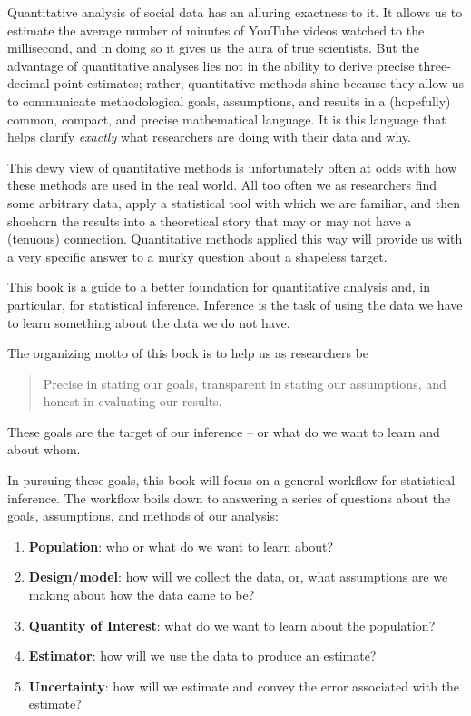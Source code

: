 \documentclass[
  letterpaper,
  DIV=11,
  numbers=noendperiod]{scrreprt}
\providecommand{\tightlist}{%
  \setlength{\itemsep}{0pt}\setlength{\parskip}{0pt}}\usepackage{longtable,booktabs,array}
\theoremstyle{plain}
\theoremstyle{definition}
\theoremstyle{definition}
\theoremstyle{remark}
\begin{document}
Quantitative analysis of social data has an alluring exactness to it. It
allows us to estimate the average number of minutes of YouTube videos
watched to the millisecond, and in doing so it gives us the aura of true
scientists. But the advantage of quantitative analyses lies not in the
ability to derive precise three-decimal point estimates; rather,
quantitative methods shine because they allow us to communicate
methodological goals, assumptions, and results in a (hopefully) common,
compact, and precise mathematical language. It is this language that
helps clarify \emph{exactly} what researchers are doing with their data
and why.

This dewy view of quantitative methods is unfortunately often at odds
with how these methods are used in the real world. All too often we as
researchers find some arbitrary data, apply a statistical tool with
which we are familiar, and then shoehorn the results into a theoretical
story that may or may not have a (tenuous) connection. Quantitative
methods applied this way will provide us with a very specific answer to
a murky question about a shapeless target.

This book is a guide to a better foundation for quantitative analysis
and, in particular, for statistical inference. Inference is the task of
using the data we have to learn something about the data we do not have.

The organizing motto of this book is to help us as researchers be

\begin{quote}
Precise in stating our goals, transparent in stating our assumptions,
and honest in evaluating our results.
\end{quote}

These goals are the target of our inference -- or what do we want to
learn and about whom.

In pursuing these goals, this book will focus on a general workflow for
statistical inference. The workflow boils down to answering a series of
questions about the goals, assumptions, and methods of our analysis:

\begin{enumerate}
\def\labelenumi{\arabic{enumi}.}
\tightlist
\item
  \textbf{Population}: who or what do we want to learn about?
\item
  \textbf{Design/model}: how will we collect the data, or, what
  assumptions are we making about how the data came to be?
\item
  \textbf{Quantity of Interest}: what do we want to learn about the
  population?\\
\item
  \textbf{Estimator}: how will we use the data to produce an estimate?
\item
  \textbf{Uncertainty}: how will we estimate and convey the error
  associated with the estimate?
\end{enumerate}
\end{document}
